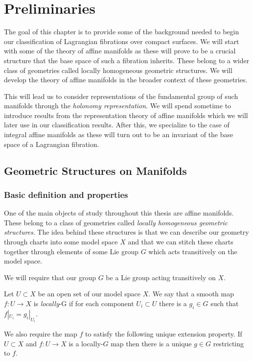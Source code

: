 \setcounter{chapter}{0}
\chapter{Preliminaries}\label{ch:prelim}
The goal of this chapter is to provide some of the background needed to begin
our classification of Lagrangian fibrations over compact surfaces. We will
start with some of the theory of affine manifolds as these will prove to be a
crucial structure that the base space of such a fibration inherits. These
belong to a wider class of geometries called locally homogeneous geometric
structures. We will develop the theory of affine manifolds in the broader
context of these geometries.

This will lead us to consider representations of the fundamental group of such
manifolds through the \emph{holonomy representation}. We will spend sometime to
introduce results from the representation theory of affine manifolds which we
will later use in our classification results. After this, we specialize to the
case of integral affine manifolds as these will turn out to be an invariant of
the base space of a Lagrangian fibration.

\section{Geometric Structures on Manifolds}
\subsection{Basic definition and properties}
One of the main objects of study throughout this thesis are affine manifolds.
These belong to a class of geometries called \emph{locally homogeneous
    geometric structures}. The idea behind these structures is that we can describe
our geometry through charts into some model space $X$ and that we can stitch
these charts together through elements of some Lie group $G$ which acts
transitively on the model space.

We will require that our group $G$ be a Lie group acting transitively on $X$.

\begin{definition}\label{def:locally-g}
    Let $U \subset X$ be an open set of our model space $X$. We say that a smooth map $f: U \to X$
    is \textit{locally}-G if for each component $U_i \subset U$ there is a $g_i \in G$ such that
    $f|_{U_i} = g_i|_{U_i}$.

    We also require the map $f$ to satisfy the following unique extension property.
    If $U \subset X$ and $f: U \to X$ is a locally-$G$ map then there is a unique
    $g \in G$ restricting to $f$.
\end{definition}

